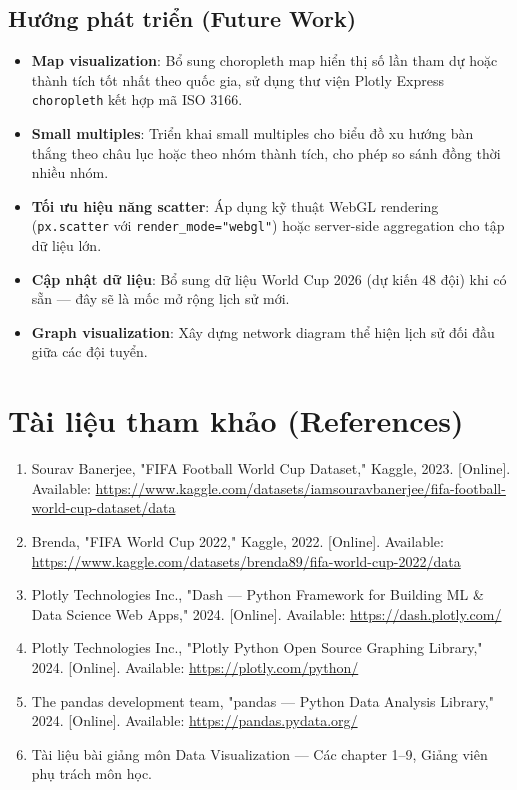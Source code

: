 \documentclass[12pt,a4paper]{article}
\begin{document}
\subsection{Hướng phát triển (Future Work)}
\begin{itemize}
    \item \textbf{Map visualization}: Bổ sung choropleth map hiển thị số lần tham dự hoặc thành tích tốt nhất theo quốc gia, sử dụng thư viện Plotly Express \texttt{choropleth} kết hợp mã ISO 3166.
    \item \textbf{Small multiples}: Triển khai small multiples cho biểu đồ xu hướng bàn thắng theo châu lục hoặc theo nhóm thành tích, cho phép so sánh đồng thời nhiều nhóm.
    \item \textbf{Tối ưu hiệu năng scatter}: Áp dụng kỹ thuật WebGL rendering (\texttt{px.scatter} với \texttt{render\_mode="webgl"}) hoặc server-side aggregation cho tập dữ liệu lớn.
    \item \textbf{Cập nhật dữ liệu}: Bổ sung dữ liệu World Cup 2026 (dự kiến 48 đội) khi có sẵn --- đây sẽ là mốc mở rộng lịch sử mới.
    \item \textbf{Graph visualization}: Xây dựng network diagram thể hiện lịch sử đối đầu giữa các đội tuyển.
\end{itemize}


\newpage
\section{Tài liệu tham khảo (References)}

\begin{enumerate}
    \item Sourav Banerjee, "FIFA Football World Cup Dataset," Kaggle, 2023. [Online]. Available: \url{https://www.kaggle.com/datasets/iamsouravbanerjee/fifa-football-world-cup-dataset/data}
    \item Brenda, "FIFA World Cup 2022," Kaggle, 2022. [Online]. Available: \url{https://www.kaggle.com/datasets/brenda89/fifa-world-cup-2022/data}
    \item Plotly Technologies Inc., "Dash --- Python Framework for Building ML \& Data Science Web Apps," 2024. [Online]. Available: \url{https://dash.plotly.com/}
    \item Plotly Technologies Inc., "Plotly Python Open Source Graphing Library," 2024. [Online]. Available: \url{https://plotly.com/python/}
    \item The pandas development team, "pandas --- Python Data Analysis Library," 2024. [Online]. Available: \url{https://pandas.pydata.org/}
    \item Tài liệu bài giảng môn Data Visualization --- Các chapter 1--9, Giảng viên phụ trách môn học.
\end{enumerate}
\end{document}
